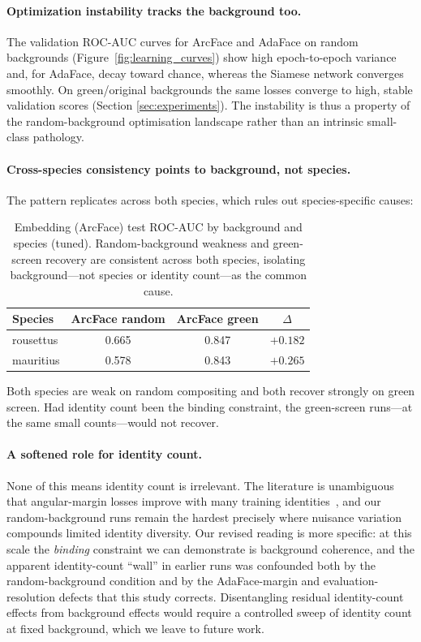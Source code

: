 \paragraph{Optimization instability tracks the background too.}
The validation ROC-AUC curves for ArcFace and AdaFace on random backgrounds
(Figure~\ref{fig:learning_curves}) show high epoch-to-epoch variance and, for AdaFace,
decay toward chance, whereas the Siamese network converges smoothly.  On green/original
backgrounds the same losses converge to high, stable validation scores (Section
\ref{sec:experiments}).  The instability is thus a property of the random-background
optimisation landscape rather than an intrinsic small-class pathology.

\paragraph{Cross-species consistency points to background, not species.}
The pattern replicates across both species, which rules out species-specific causes:

\begin{table}[h]
\centering
\caption{Embedding (ArcFace) test ROC-AUC by background and species (tuned).
Random-background weakness and green-screen recovery are consistent across both
species, isolating background---not species or identity count---as the common cause.}
\label{tab:crossspecies}
\setlength{\tabcolsep}{7pt}
\begin{tabular}{lccc}
\toprule
Species & ArcFace random & ArcFace green & $\Delta$ \\
\midrule
rousettus & 0.665 & 0.847 & $+0.182$ \\
mauritius & 0.578 & 0.843 & $+0.265$ \\
\bottomrule
\end{tabular}
\end{table}

Both species are weak on random compositing and both recover strongly on green screen.
Had identity count been the binding constraint, the green-screen runs---at the same
small counts---would not recover.

\paragraph{A softened role for identity count.}
None of this means identity count is irrelevant.  The literature is unambiguous that
angular-margin losses improve with many training identities~\cite{deng2019arcface,
kim2022adaface}, and our random-background runs remain the hardest precisely where
nuisance variation compounds limited identity diversity.  Our revised reading is more
specific: at this scale the \emph{binding} constraint we can demonstrate is background
coherence, and the apparent identity-count ``wall'' in earlier runs was confounded both
by the random-background condition and by the AdaFace-margin and evaluation-resolution
defects that this study corrects.  Disentangling residual identity-count effects from
background effects would require a controlled sweep of identity count at fixed
background, which we leave to future work.

